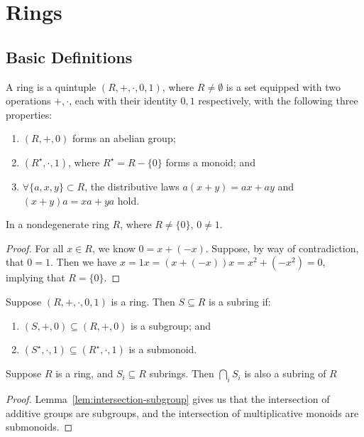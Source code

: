 \section{Rings}

\subsection{Basic Definitions}

\begin{definition}
    A ring is a quintuple \((R,+,\cdot,0,1)\),
    where \(R \neq \emptyset\) is a set
    equipped with two operations \(+,\cdot\),
    each with their identity \(0,1\) respectively,
    with the following three properties:
    \begin{enumerate}[label={(\roman*)}, itemsep=0mm]
        \item \((R,+,0)\) forms an abelian group;
        \item \((R^\star,\cdot,1)\),
            where \(R^\star = R - \{0\}\) forms a monoid; and
        \item \(\forall \{a,x,y\} \subset R\),
            the distributive laws \(a(x+y) = ax + ay\)
            and \((x+y)a = xa + ya\) hold.
    \end{enumerate}
\end{definition}
\begin{proposition}
    In a nondegenerate ring \(R\), where \(R \neq \{0\}\), \(0 \neq 1\).
\end{proposition}
\begin{proof}
    For all \(x \in R\), we know \(0 = x + (-x)\).
    Suppose, by way of contradiction, that \(0 = 1\).
    Then we have \(x = 1x = (x+(-x))x = x^2 + (-x^2) = 0\),
    implying that \(R = \{0\}\).
\end{proof}

\begin{definition}
    Suppose \((R,+,\cdot,0,1)\) is a ring.
    Then \(S \subseteq R\) is a subring if:
    \begin{enumerate}[label={(\roman*)}, itemsep=0mm]
        \item \((S,+,0) \subseteq (R,+,0)\) is a subgroup; and
        \item \((S^\star,\cdot,1) \subseteq (R^\star,\cdot,1)\) is a submonoid.
    \end{enumerate}
\end{definition}

\begin{lemma}\label{lem:intersection-subring}
    Suppose \(R\) is a ring, and \(S_i \subseteq R\) subrings.
    Then \(\bigcap_i S_i\) is also a subring of \(R\)
\end{lemma}
\begin{proof}
    Lemma~\ref{lem:intersection-subgroup} gives us that
    the intersection of additive groups are subgroups,
    and the intersection of multiplicative monoids are submonoids.
\end{proof}

